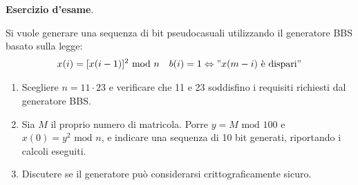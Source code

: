\begin{framed}
	\noindent \textbf{Esercizio d'esame}.
	
	\noindent Si vuole generare una sequenza di bit pseudocasuali utilizzando il generatore BBS basato sulla
	legge: 
	\begin{align*}
		x(i)=[x(i-1)]^2 \text{ mod } n&&b(i)=1 \Leftrightarrow "\text{$x(m-i)$ è dispari}"
	\end{align*}
	\begin{enumerate}
		\item Scegliere $n = 11 \cdot 23$ e verificare che 11 e 23 soddisfino i requisiti richiesti dal generatore BBS. 
		\item Sia $M$ il proprio numero di matricola. Porre $y = M \text{ mod } 100$ e $x(0) = y^2 \text{ mod } n$, e indicare una
		sequenza di 10 bit generati, riportando i calcoli eseguiti. 
		\item Discutere se il generatore può considerarsi crittograficamente sicuro. 
	\end{enumerate}
	

\end{framed}
